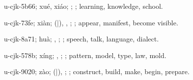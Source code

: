 \begin{multicols}{2}
{\cjkgGlue{}u-cjk-5b66; xué, xiáo; \cjkgGlue{}\cjkgGlue{}\cjkgGlue{}; \cjkgGlue{}; learning, knowledge, school.

\cjkgGlue{}u-cjk-73fe; xiàn; \cjkgGlue{}\cjkgGlue{}(\cjkgGlue{}|\cjkgGlue{}), \cjkgGlue{}, \cjkgGlue{}\cjkgGlue{}\cjkgGlue{}; \cjkgGlue{}; appear, manifest, become visible.

\cjkgGlue{}u-cjk-8a71; huà; \cjkgGlue{}\cjkgGlue{}\cjkgGlue{}, \cjkgGlue{}; \cjkgGlue{}; speech, talk, language, dialect.

\cjkgGlue{}u-cjk-578b; xíng; \cjkgGlue{}, \cjkgGlue{}; \cjkgGlue{}; pattern, model, type, law, mold.

\cjkgGlue{}u-cjk-9020; zào; \cjkgGlue{}\cjkgGlue{}(\cjkgGlue{}|\cjkgGlue{}), \cjkgGlue{}\cjkgGlue{}\cjkgGlue{}; \cjkgGlue{}; construct, build, make, begin, prepare.

}
\end{multicols}
